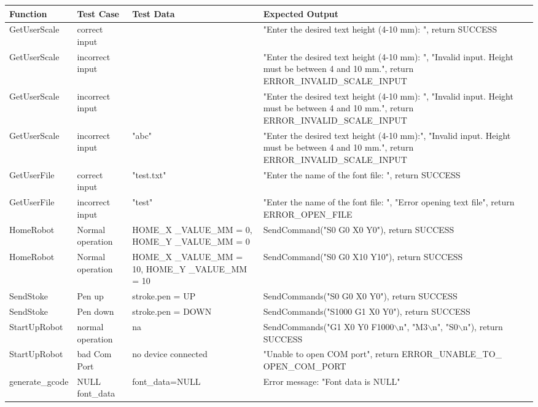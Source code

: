 \begin{longtable}{|>{\raggedright\arraybackslash}m{}|>{\raggedright\arraybackslash}m{}|>{\raggedright\arraybackslash}m{}|>{\raggedright\arraybackslash}m{}|}
    \hline
    \textbf{Function} & \textbf{Test Case} & \textbf{Test Data} & \textbf{Expected Output} \\ \hline
    GetUserScale & correct input & 4mm & "Enter the desired text height (4-10 mm): ", return SUCCESS\\ \hline
    GetUserScale & incorrect input & 11mm & "Enter the desired text height (4-10 mm): ", "Invalid input. Height must be between 4 and 10 mm.", return ERROR\_INVALID\_SCALE\_INPUT\\ \hline
    GetUserScale & incorrect input & 3mm & "Enter the desired text height (4-10 mm): ", "Invalid input. Height must be between 4 and 10 mm.", return ERROR\_INVALID\_SCALE\_INPUT\\ \hline
    GetUserScale & incorrect input & "abc" & "Enter the desired text height (4-10 mm):", "Invalid input. Height must be between 4 and 10 mm.", return ERROR\_INVALID\_SCALE\_INPUT\\ \hline
    GetUserFile & correct input & "test.txt" & "Enter the name of the font file: ", return SUCCESS\\ \hline
    GetUserFile & incorrect input & "test" & "Enter the name of the font file: ", "Error opening text file", return ERROR\_OPEN\_FILE\\ \hline
    HomeRobot & Normal operation & HOME\_X \_VALUE\_MM = 0, HOME\_Y \_VALUE\_MM = 0 & SendCommand("S0 G0 X0 Y0"), return SUCCESS\\ \hline   
    HomeRobot & Normal operation & HOME\_X \_VALUE\_MM = 10, HOME\_Y \_VALUE\_MM = 10 & SendCommand("S0 G0 X10 Y10"), return SUCCESS\\ \hline
    SendStoke & Pen up & stroke.pen = UP & SendCommands("S0 G0 X0 Y0"), return SUCCESS\\ \hline
    SendStoke & Pen down & stroke.pen = DOWN & SendCommands("S1000 G1 X0 Y0"), return SUCCESS\\ \hline
    StartUpRobot & normal operation & na & SendCommands("G1 X0 Y0 F1000$\backslash$n", "M3$\backslash$n", "S0$\backslash$n"), return SUCCESS\\ \hline
    StartUpRobot & bad Com Port & no device connected & "Unable to open COM port", return ERROR\_UNABLE\_TO\_ OPEN\_COM\_PORT\\ \hline
    generate\_gcode & NULL font\_data & font\_data=NULL & Error message: "Font data is NULL" \\ \hline

\end{longtable}

